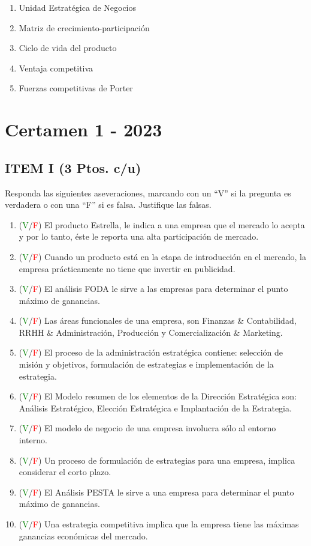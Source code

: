 \documentclass{templateNote}
\begin{document}
\begin{enumerate}
    \item Unidad Estratégica de Negocios
    \item Matriz de crecimiento-participación
    \item Ciclo de vida del producto
    \item Ventaja competitiva
    \item Fuerzas competitivas de Porter
\end{enumerate}

\newpage
\section{Certamen 1 - 2023} 

\subsection*{ITEM I (3 Ptos. c/u)}
Responda las siguientes aseveraciones, marcando con un “V” si la pregunta es verdadera o con una “F” si es falsa. Justifique las falsas.   
\begin{enumerate}
    \item (\textcolor{green}{V}/\textcolor{red}{F}) El producto Estrella, le indica a una empresa que el mercado lo acepta y por lo tanto, éste le reporta una alta participación de mercado.
    \item (\textcolor{green}{V}/\textcolor{red}{F}) Cuando un producto está en la etapa de introducción en el mercado, la empresa prácticamente no tiene que invertir en publicidad.
    \item (\textcolor{green}{V}/\textcolor{red}{F}) El análisis FODA le sirve a las empresas para determinar el punto máximo de ganancias.
    \item (\textcolor{green}{V}/\textcolor{red}{F}) Las áreas funcionales de una empresa, son Finanzas \& Contabilidad, RRHH \& Administración, Producción y Comercialización \& Marketing.
    \item (\textcolor{green}{V}/\textcolor{red}{F}) El proceso de la administración estratégica contiene: selección de misión y objetivos, formulación de estrategias e implementación de la estrategia.
    \item (\textcolor{green}{V}/\textcolor{red}{F}) El Modelo resumen de los elementos de la Dirección Estratégica son: Análisis Estratégico, Elección Estratégica e Implantación de la Estrategia.
    \item (\textcolor{green}{V}/\textcolor{red}{F}) El modelo de negocio de una empresa involucra sólo al entorno interno.
    \item (\textcolor{green}{V}/\textcolor{red}{F}) Un proceso de formulación de estrategias para una empresa, implica considerar el corto plazo.
    \item (\textcolor{green}{V}/\textcolor{red}{F}) El Análisis PESTA le sirve a una empresa para determinar el punto máximo de ganancias.
    \item (\textcolor{green}{V}/\textcolor{red}{F}) Una estrategia competitiva implica que la empresa tiene las máximas ganancias económicas del mercado.
\end{enumerate}
\end{document}
